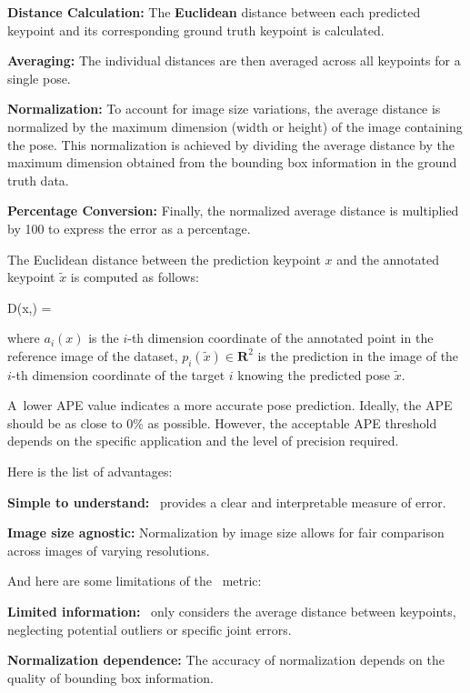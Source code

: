 \startitemize[n]
    \item {\bf Distance Calculation:} The {\bf Euclidean} distance between each predicted keypoint and its corresponding ground truth keypoint is calculated.
    \item {\bf Averaging:} The individual distances are then averaged across all keypoints for a single pose.
    \item {\bf Normalization:} To account for image size variations, the average distance is normalized by the maximum dimension (width or height) of the image containing the pose. This normalization is achieved by dividing the average distance by the maximum dimension obtained from the bounding box information in the ground truth data.
    \item {\bf Percentage Conversion:} Finally, the normalized average distance is multiplied by 100 to express the error as a percentage.
\stopitemize

The Euclidean distance between the prediction keypoint $ x $ and the annotated keypoint $ \tilde{x}$ is computed as follows:

\startplaceformula[reference=formula:euclidean-distance]
    \startformula D(x,) = 
    \stopformula
\stopplaceformula

where $ a_i (x) $ is the $ i $-th dimension coordinate of the annotated point in the reference image of the dataset, $ p_i (\tilde{x}) \in  \mathbf R^2 $ is the prediction in the image of the $ i $-th dimension coordinate of the target $ i $ knowing the predicted pose $ \tilde{x} $.

A~lower APE value indicates a more accurate pose prediction. Ideally, the APE should be as close to 0\% as possible. However, the acceptable APE threshold depends on the specific application and the level of precision required.

Here is the list of advantages:
\startitemize[1]
    \item {\bf Simple to understand:} \APE\ provides a clear and interpretable measure of error.
    \item {\bf Image size agnostic:} Normalization by image size allows for fair comparison across images of varying resolutions.
\stopitemize

And here are some limitations of the \APE\ metric:
\startitemize[1]
    \item {\bf Limited information:} \APE\ only considers the average distance between keypoints, neglecting potential outliers or specific joint errors.
    \item {\bf Normalization dependence:} The accuracy of normalization depends on the quality of bounding box information.
\stopitemize

